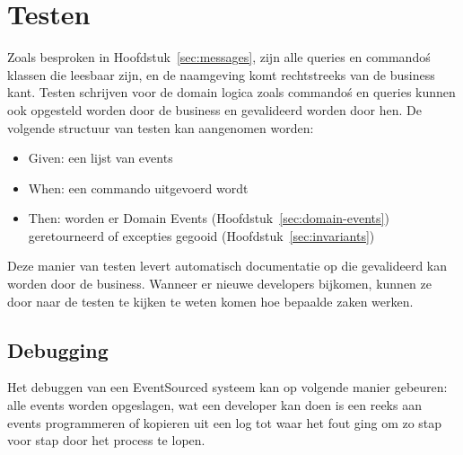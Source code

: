 
\section{Testen}
\label{sec:testen}

Zoals besproken in Hoofdstuk~\ref{sec:messages}, zijn alle queries en commando\'s klassen die leesbaar zijn, en de naamgeving komt rechtstreeks van de business kant. Testen schrijven voor de domain logica zoals commando\'s en queries kunnen ook opgesteld worden door de business en gevalideerd worden door hen.
De volgende structuur van testen kan aangenomen worden:

\begin{itemize}
  \item{Given: een lijst van events}
  \item{When: een commando uitgevoerd wordt}
  \item{Then: worden er Domain Events (Hoofdstuk~\ref{sec:domain-events}) geretourneerd of excepties gegooid (Hoofdstuk~\ref{sec:invariants})}
\end{itemize}

Deze manier van testen levert automatisch documentatie op die gevalideerd kan worden door de business.
Wanneer er nieuwe developers bijkomen, kunnen ze door naar de testen te kijken te weten komen hoe bepaalde zaken werken.

\subsection{Debugging}
\label{subsec:debugging}

Het debuggen van een EventSourced systeem kan op volgende manier gebeuren: alle events worden opgeslagen, wat een developer kan doen is een reeks aan events programmeren of kopieren uit een log tot waar het fout ging om zo stap voor stap door het process te lopen.

